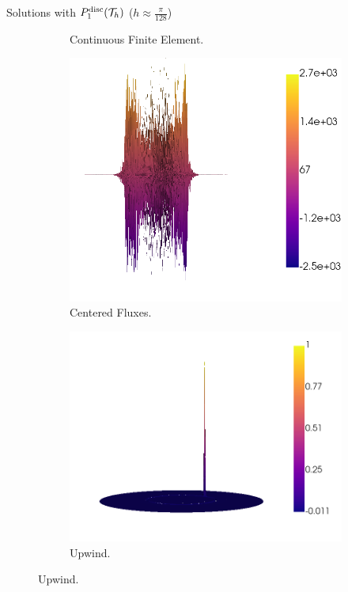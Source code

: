 \begin{frame}{Solutions with $\relax{P}^{\text{disc}}_1(\mathcal{T}_h)$ ($h\approx\frac{\pi}{128}$)}
\begin{figure}[h!]
\begin{subfigure}[b]{0.49\textwidth}
						\caption{Continuous Finite Element.}
					\end{subfigure}
					\begin{subfigure}[b]{0.49\textwidth}
						\centering
						\includegraphics[scale=0.16]{img/Conveccion_Reaccion/strong/conv_react_u_CF_nx-256.png}
						\caption{Centered Fluxes.}
					\end{subfigure}
					\begin{subfigure}[b]{0.49\textwidth}
						\centering
						\includegraphics[scale=0.16]{img/Conveccion_Reaccion/strong/conv_react_u_UPW_nx-256.png}
						\caption{Upwind.}
					\end{subfigure}
				\end{figure}
				\end{frame}

